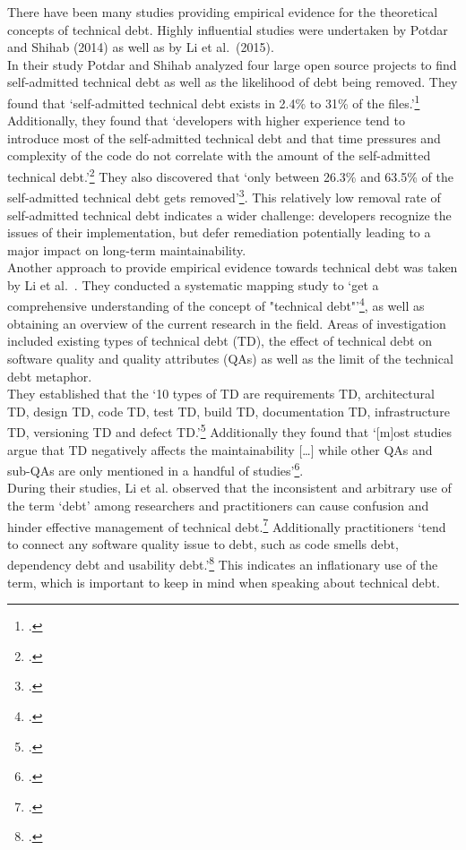 There have been many studies providing empirical evidence for the theoretical concepts of technical debt. Highly influential studies were undertaken by Potdar and Shihab (2014) as well as by Li et al.\ (2015).\\
In their study Potdar and Shihab analyzed four large open source projects to find self-admitted technical debt as well as the likelihood of debt being removed. They found that `self-admitted technical debt exists in 2.4\% to 31\% of the files.'\footcite[1]{potdarExploratoryStudySelfAdmitted2014}
Additionally, they found that `developers with higher experience tend to introduce most of the self-admitted technical debt and that time pressures and complexity of the code do not correlate with the amount of the self-admitted technical debt.'\footcite[1]{potdarExploratoryStudySelfAdmitted2014}
They also discovered that `only between 26.3\% and 63.5\% of the self-admitted technical debt gets removed'\footcite[1]{potdarExploratoryStudySelfAdmitted2014}. This relatively low removal rate of self-admitted technical debt indicates a wider challenge:
developers recognize the issues of their implementation, but defer remediation potentially leading to a major impact on long-term maintainability.\\
Another approach to provide empirical evidence towards technical debt was taken by Li et al.\ . They conducted a systematic mapping study to `get a comprehensive understanding of the concept of "technical debt"'\footcite[194]{liSystematicMappingStudy2015}, as well as obtaining an overview of the current research in the field.
Areas of investigation included existing types of technical debt (TD), the effect of technical debt on software quality and quality attributes (QAs) as well as the limit of the technical debt metaphor.\\
They established that the `10 types of TD are requirements TD, architectural TD, design TD, code TD, test TD, build TD, documentation TD, infrastructure TD, versioning TD and defect TD.'\footcite[215]{liSystematicMappingStudy2015}
Additionally they found that `[m]ost studies argue that TD negatively affects the maintainability [\ldots] while other QAs and sub-QAs are only mentioned in a handful of studies'\footcite[215]{liSystematicMappingStudy2015}.\\
During their studies,  Li et al. observed that the inconsistent and arbitrary use of the term `debt' among researchers and practitioners can cause confusion and hinder effective management of technical debt.\footcite[211]{liSystematicMappingStudy2015} Additionally practitioners `tend to connect any software quality issue to debt, such as code smells debt, dependency debt and usability debt.'\footcite[212]{liSystematicMappingStudy2015}
This indicates an inflationary use of the term, which is important to keep in mind when speaking about technical debt.\\

